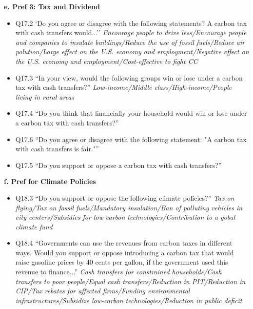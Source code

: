 \documentclass{article}
\begin{document}
\begin{flushleft}
\textbf{e. Pref 3: Tax and Dividend}
\end{flushleft}

\begin{itemize}
    \item Q17.2 `Do you agree or disagree with the following statements? A carbon tax with cash transfers would...'' \textit{Encourage people to drive less/Encourage people and companies to insulate buildings/Reduce the use of fossil fuels/Reduce air polution/Large effect on the U.S. economy and employment/Negative effect on the U.S. economy and employment/Cost-effective to fight CC}
    \item Q17.3 ``In your view, would the following groups win or lose under a carbon tax with cash transfers?'' \textit{Low-income/Middle class/High-income/People living in rural areas}
    \item Q17.4 ``Do you think that financially your household would win or lose under a carbon tax with cash transfers?''
    \item Q17.6 ``Do you agree or disagree with the following statement: "A carbon tax with cash transfers is fair."''
    \item Q17.5 ``Do you support or oppose a carbon tax with cash transfers?''
\end{itemize}

\begin{flushleft}
\textbf{f. Pref for Climate Policies}
\end{flushleft}

\begin{itemize}
    \item Q18.3 ``Do you support or oppose the following climate policies?'' \textit{Tax on flying/Tax on fossil fuels/Mandatory insulation/Ban of polluting vehicles in city-centers/Subsidies for low-carbon technologies/Contribution to a gobal climate fund}
    \item Q18.4 ``Governments can use the revenues from carbon taxes in different ways. Would you support or oppose introducing a carbon tax that would raise gasoline prices by 40 cents per gallon, if the government used this revenue to finance...'' \textit{Cash transfers for constrained households/Cash transfers to poor people/Equal cash transfers/Reduction in PIT/Reduction in CIP/Tax rebates for affected firms/Funding environmental infrastructures/Subsidize low-carbon technologies/Reduction in public deficit}
\end{itemize}
\end{document}
